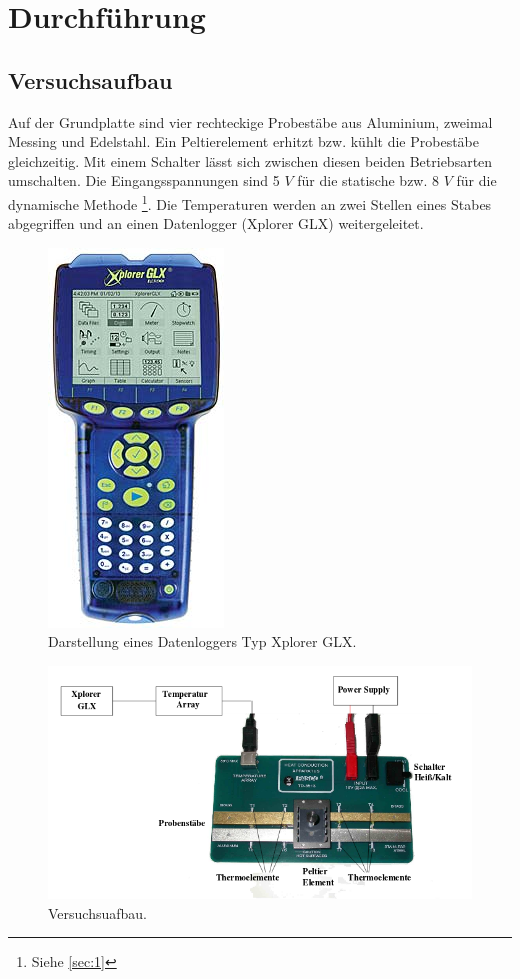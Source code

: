 \section{Durchführung}
\subsection{Versuchsaufbau}
Auf der Grundplatte sind vier rechteckige Probestäbe aus Aluminium, zweimal Messing
und Edelstahl. Ein Peltierelement erhitzt bzw. kühlt die Probestäbe gleichzeitig.
Mit einem Schalter lässt sich zwischen diesen beiden Betriebsarten umschalten.
Die Eingangsspannungen sind 5 $\textit{V}$ für die statische bzw. 8 $\textit{V}$
für die dynamische Methode \footnote{Siehe \ref{sec:1}}. Die Temperaturen werden
an zwei Stellen eines Stabes abgegriffen und an einen Datenlogger (Xplorer GLX)
weitergeleitet.
\begin{figure}
  \centering
  \includegraphics[scale=0.5]{xplorer_glx.jpg}
  \caption{Darstellung eines Datenloggers Typ Xplorer GLX.}
  \label{fig:1}
\end{figure}
\begin{figure}
  \centering
  \includegraphics[scale=0.5]{versuchsaufbau.png}
  \caption{Versuchsuafbau.}
  \label{fig:2}
\end{figure}
